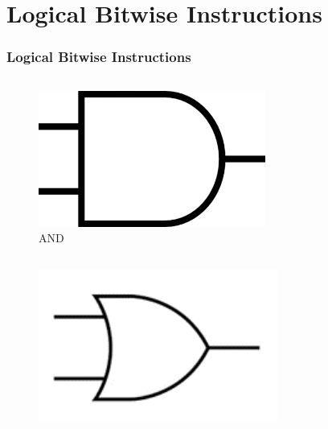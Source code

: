 \documentclass[
	10pt, %
	hmargin=1cm,vmargin=0cm,head=0.5cm,headsep=0pt,foot=0.5cm,margin=2cm
]{beamer}
\begin{document}
\section{Logical Bitwise Instructions} 
\begin{frame}
	\frametitle{Logical Bitwise Instructions}
	\begin{columns}[c]
		
		\begin{column}{0.45\textwidth} 
			\begin{columns}[c]
				\begin{column}{0.3\textwidth} 
					\begin{figure}
						\includegraphics[width=0.7\textwidth]{and.png}
						\caption{AND}
					\end{figure}
				\end{column}
				\begin{column}{0.7\textwidth} 
					\begin{table}
					\end{table}
				\end{column}
			\end{columns}
			\pause
			\begin{columns}[c]
				\begin{column}{0.3\textwidth} 
					\begin{figure}
						\includegraphics[width=0.7\textwidth]{or.png}

\end{figure}
\end{column}
\end{columns}
\end{column}
\end{columns}
\end{frame}
\end{document}
